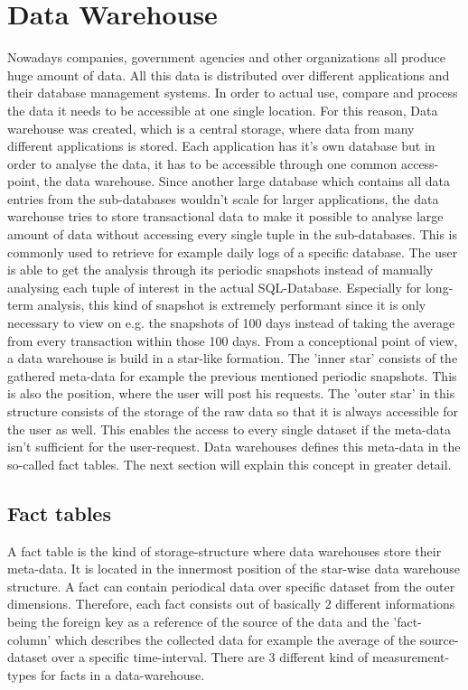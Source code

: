\documentclass[12pt,a4paper,oneside, 
liststotoc, 					%
bibtotoc,						%
titlepage, 						%
headsepline, 					%
BCOR6mm,						%
openany,							%
]{scrreprt}
\begin{document}
\section{Data Warehouse}\label{dw}
Nowadays companies, government agencies and other organizations all produce huge amount of data. All this data is distributed over different applications and their database management systems. In order to actual use, compare and process the data it needs to be accessible at one single location. 
For this reason, Data warehouse was created, which is a central storage, where data from many different applications is stored. Each application has it's own database but in order to analyse the data, it has to be accessible through one common access-point, the data warehouse. Since another large database which contains all data entries from the sub-databases wouldn't scale for larger applications, the data warehouse tries to store transactional data to make it possible to analyse large amount of data without accessing every single tuple in the sub-databases. This is commonly used to retrieve for example daily logs of a specific database. The user is able to get the analysis through its periodic snapshots instead of manually analysing each tuple of interest in the actual SQL-Database. Especially for long-term analysis, this kind of snapshot is extremely performant since it is only necessary to view on e.g. the snapshots of 100 days instead of taking the average from every transaction within those 100 days.
From a conceptional point of view, a data warehouse is build in a star-like formation. The 'inner star' consists of the gathered meta-data for example the previous mentioned periodic snapshots. This is also the position, where the user will post his requests. The 'outer star' in this structure consists of the storage of the raw data so that it is always accessible for the user as well. This enables the access to every single dataset if the meta-data isn't sufficient for the user-request.
Data warehouses defines this meta-data in the so-called fact tables. The next section will explain this concept in greater detail.
\subsection{Fact tables}\label{factTables}
A fact table is the kind of storage-structure where data warehouses store their meta-data. It is located in the innermost position of the star-wise data warehouse structure. A fact can contain periodical data over specific dataset from the outer dimensions. Therefore, each fact consists out of basically 2 different informations being the foreign key as a reference of the source of the data and the 'fact-column' which describes the collected data for example the average of the source-dataset over a specific time-interval. There are 3 different kind of measurement-types for facts in a data-warehouse.
\end{document}
